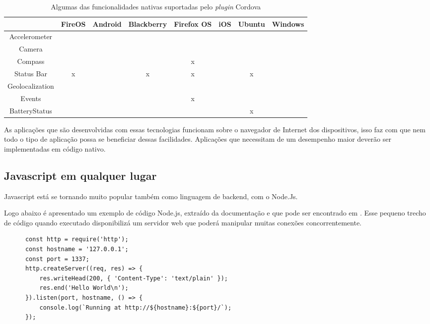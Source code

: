 \begin{table}[!htb]
	\footnotesize
	\centering
	\caption[Funcionalidades nativas suportadas pelo \textit{plugin} Cordova]{Algumas das funcionalidades nativas suportadas pelo \textit{plugin} Cordova}
	\begin{tabular}{*8{c|}}
		 & \textbf{FireOS} & \textbf{Android} & \textbf{Blackberry} & \textbf{Firefox OS} & \textbf{iOS} & \textbf{Ubuntu} & \textbf{Windows}\\ \hline
		Accelerometer & \checkmark & \checkmark & \checkmark & \checkmark & \checkmark & \checkmark & \checkmark\\ \hline \SPACE
		Camera & \checkmark & \checkmark & \checkmark & \checkmark & \checkmark & \checkmark & \checkmark\\ \hline \SPACE
		Compass & \checkmark & \checkmark & \checkmark & x & \checkmark & \checkmark & \checkmark\\ \hline \SPACE
		Status Bar & x & \checkmark & x & x & \checkmark & x & \checkmark\\ \hline \SPACE
		Geolocalization & \checkmark & \checkmark & \checkmark & \checkmark & \checkmark & \checkmark & \checkmark\\ \hline \SPACE
		Events & \checkmark & \checkmark & \checkmark & x & \checkmark & \checkmark & \checkmark\\ \hline \SPACE
		BatteryStatus & \checkmark & \checkmark & \checkmark & \checkmark & \checkmark & x & \checkmark\\
		\hline
	\end{tabular}
	\label{tab:cordova}
\end{table}

As aplicações que são desenvolvidas com essas tecnologias funcionam sobre o navegador de Internet dos dispositivos, isso faz com que nem todo o tipo de aplicação possa se beneficiar dessas facilidades. Aplicações que necessitam de um desempenho maior deverão ser implementadas em código nativo.

\subsection{Javascript em qualquer lugar}
Javascript está se tornando muito popular também como linguagem de backend, com o Node.Js.

Logo abaixo é apresentado um exemplo de código Node.js, extraído da documentação e que pode ser encontrado em \cite{nodejs}. Esse pequeno trecho de código quando executado disponibilizá um servidor web que poderá manipular muitas conexões concorrentemente.
\begin{verbatim}
	  const http = require('http');
	  const hostname = '127.0.0.1';
	  const port = 1337;
	  http.createServer((req, res) => {
	      res.writeHead(200, { 'Content-Type': 'text/plain' });
	      res.end('Hello World\n');
	  }).listen(port, hostname, () => {
	      console.log(`Running at http://${hostname}:${port}/`);
	  });
\end{verbatim}

